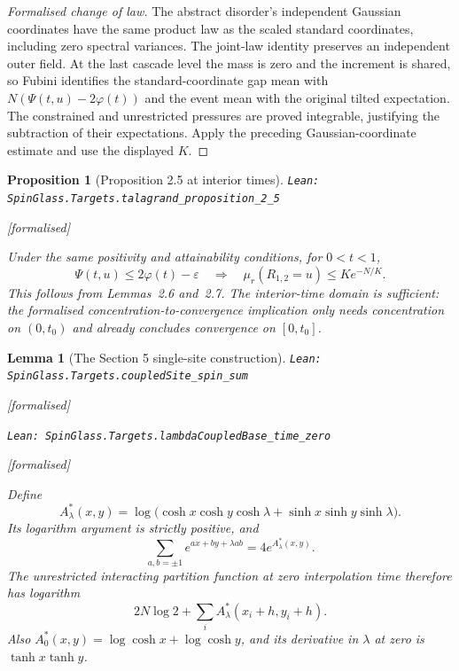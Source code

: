 \documentclass[11pt]{article}
\providecommand{\lean}[1]{\leavevmode\par\nopagebreak
  {\noindent\normalfont\footnotesize\raggedright\texttt{Lean: #1}\par}\nopagebreak}
\providecommand{\leanok}{\par\nopagebreak
  {\noindent\normalfont\footnotesize\textcolor{green!50!black}{[formalised]}\par}\nopagebreak}
\newtheorem{proposition}[theorem]{Proposition}
\newtheorem{lemma}[theorem]{Lemma}
\begin{document}
\begin{proof}[Formalised change of law]
The abstract disorder's independent Gaussian coordinates have the same product
law as the scaled standard coordinates, including zero spectral variances.
The joint-law identity preserves an independent outer field. At the last cascade
level the mass is zero and the increment is shared, so Fubini identifies the
standard-coordinate gap mean with $N(\Psi(t,u)-2\varphi(t))$ and the event mean
with the original tilted expectation. The constrained and unrestricted pressures
are proved integrable, justifying the subtraction of their expectations.
Apply the preceding Gaussian-coordinate estimate and use the displayed $K$.
\end{proof}

\begin{proposition}[Proposition 2.5 at interior times]
\lean{SpinGlass.Targets.talagrand\_proposition\_2\_5}\leanok
Under the same positivity and attainability conditions, for $0<t<1$,
\[
\Psi(t,u)\le2\varphi(t)-\varepsilon
\quad\Longrightarrow\quad
\mu_r(R_{1,2}=u)\le K e^{-N/K}.
\]
This follows from Lemmas~2.6 and~2.7. The interior-time domain is sufficient:
the formalised concentration-to-convergence implication only needs concentration
on $(0,t_0)$ and already concludes convergence on $[0,t_0]$.
\end{proposition}

\begin{lemma}[The Section 5 single-site construction]
\lean{SpinGlass.Targets.coupledSite\_spin\_sum}\leanok
\lean{SpinGlass.Targets.lambdaCoupledBase\_time\_zero}\leanok
Define
\[
A^*_{\lambda}(x,y)=\log\bigl(\cosh x\cosh y\cosh\lambda
  +\sinh x\sinh y\sinh\lambda\bigr).
\]
Its logarithm argument is strictly positive, and
\[
\sum_{a,b=\pm1}e^{ax+by+\lambda ab}=4e^{A^*_{\lambda}(x,y)}.
\]
The unrestricted interacting partition function at zero interpolation time
therefore has logarithm
\[
2N\log 2+\sum_i A^*_{\lambda}(x_i+h,y_i+h).
\]
Also $A^*_0(x,y)=\log\cosh x+\log\cosh y$, and its derivative in $\lambda$
at zero is $\tanh x\tanh y$.
\end{lemma}
\end{document}
